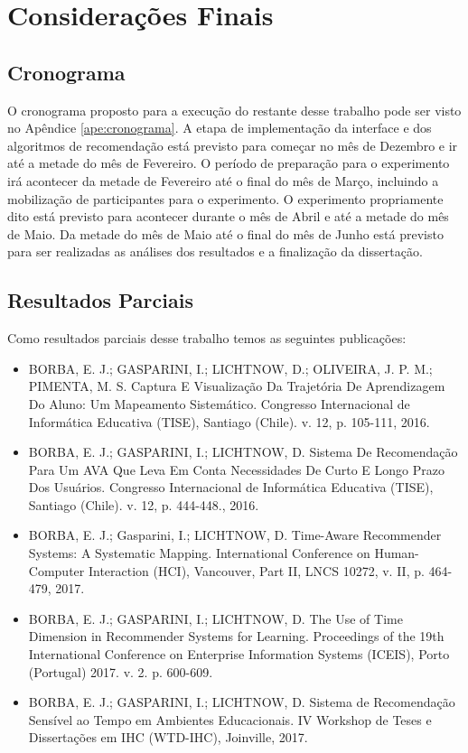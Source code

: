 \chapter{Considerações Finais}\label{chapter:conclusoes}

\section{Cronograma}

O cronograma proposto para a execução do restante desse trabalho pode ser visto no Apêndice \ref{ape:cronograma}. A etapa
de implementação da interface e dos algoritmos de recomendação está previsto para começar no mês de Dezembro e ir até
a metade do mês de Fevereiro. O período de preparação para o experimento irá acontecer da metade de Fevereiro até o
final do mês de Março, incluindo a mobilização de participantes para o experimento. O experimento propriamente dito está
previsto para acontecer durante o mês de Abril e até a metade do mês de Maio. Da metade do mês de Maio até o final do mês de Junho
está previsto para ser realizadas as análises dos resultados e a finalização da dissertação.

\section{Resultados Parciais}

Como resultados parciais desse trabalho temos as seguintes publicações:

\begin{itemize}
\item BORBA, E. J.; GASPARINI, I.; LICHTNOW, D.; OLIVEIRA, J. P. M.; PIMENTA, M. S. Captura E Visualização Da Trajetória De Aprendizagem Do Aluno: Um Mapeamento Sistemático. Congresso Internacional de Informática Educativa (TISE), Santiago (Chile). v. 12, p. 105-111, 2016.
\item BORBA, E. J.; GASPARINI, I.; LICHTNOW, D. Sistema De Recomendação Para Um AVA Que Leva Em Conta Necessidades De Curto E Longo Prazo Dos Usuários. Congresso Internacional de Informática Educativa (TISE), Santiago (Chile). v. 12, p. 444-448., 2016.
\item BORBA, E. J.; Gasparini, I.; LICHTNOW, D. Time-Aware Recommender Systems: A Systematic Mapping. International Conference on Human-Computer Interaction (HCI), Vancouver, Part II, LNCS 10272, v. II, p. 464-479, 2017.
\item BORBA, E. J.; GASPARINI, I.; LICHTNOW, D. The Use of Time Dimension in Recommender Systems for Learning. Proceedings of the 19th International Conference on Enterprise Information Systems (ICEIS), Porto (Portugal) 2017. v. 2. p. 600-609.
\item BORBA, E. J.; GASPARINI, I.; LICHTNOW, D. Sistema de Recomendação Sensível ao Tempo em Ambientes Educacionais. IV Workshop de Teses e Dissertações em IHC (WTD-IHC), Joinville, 2017.
\end{itemize}